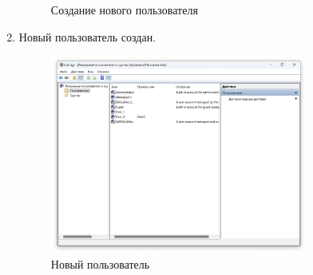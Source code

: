\documentclass[a4paper, 14pt]{report}
\begin{document}
\begin{enumerate}
{\begin{figure}[H]
              \caption{Создание нового пользователя}
          \end{figure}
          }
    \item {Новый пользователь создан.
          \begin{figure}[H]
              \centering
              \includegraphics[width=0.8\textwidth]{../images/lusrmgr_new_user.png}
              \caption{Новый пользователь}
          \end{figure}
          }
\end{enumerate}
\end{document}
